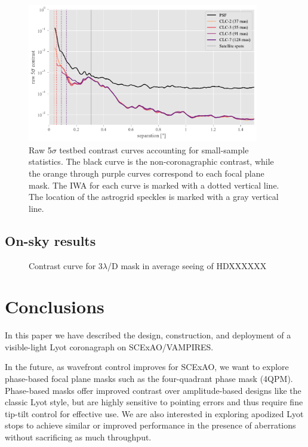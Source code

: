 \documentclass[]{spie}  %
\begin{document}
\begin{figure}
   \centering
   \includegraphics[width=0.9\textwidth]{figures/bench_20220526_curves}
   \caption{Raw 5$\sigma$ testbed contrast curves accounting for small-sample statistics. The black curve is the non-coronagraphic contrast, while the orange through purple curves correspond to each focal plane mask. The IWA for each curve is marked with a dotted vertical line. The location of the astrogrid speckles is marked with a gray vertical line.}\label{fig:contrast}
\end{figure}

\subsection{On-sky results}\label{sec:onsky}


\begin{figure}
   \centering
   \caption{Contrast curve for 3$\lambda$/D mask in average seeing of HDXXXXXX}\label{fig:onsky-contrast}
\end{figure}

\section{Conclusions}\label{sec:conclusions}

In this paper we have described the design, construction, and deployment of a visible-light Lyot coronagraph on SCExAO/VAMPIRES.

In the future, as wavefront control improves for SCExAO, we want to explore phase-based focal plane masks such as the four-quadrant phase mask (4QPM)\cite{rouanFourQuadrantPhase2007}. Phase-based masks offer improved contrast over amplitude-based designs like the classic Lyot style, but are highly sensitive to pointing errors and thus require fine tip-tilt control for effective use\cite{huby2017}. We are also interested in exploring apodized Lyot stops to achieve similar or improved performance in the presence of aberrations without sacrificing as much throughput.
\end{document}
